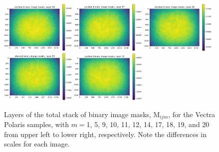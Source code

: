 \documentclass[letterpaper,11pt]{article}
\newcommand{\Mu}{\mathrm{M}}
\begin{document}
\begin{figure}[!ht]
\includegraphics[width=0.32\textwidth]{images/measuring_flatfield_corrections/mask_stack_layers_polaris/mask_stack_layer_14}
\includegraphics[width=0.32\textwidth]{images/measuring_flatfield_corrections/mask_stack_layers_polaris/mask_stack_layer_17}
\includegraphics[width=0.32\textwidth]{images/measuring_flatfield_corrections/mask_stack_layers_polaris/mask_stack_layer_18}
\includegraphics[width=0.32\textwidth]{images/measuring_flatfield_corrections/mask_stack_layers_polaris/mask_stack_layer_19}
\includegraphics[width=0.32\textwidth]{images/measuring_flatfield_corrections/mask_stack_layers_polaris/mask_stack_layer_20}
\caption{\footnotesize Layers of the total stack of binary image masks, $\Mu_{ijm}$, for the Vectra Polaris samples, with $m=$1, 5, 9, 10, 11, 12, 14, 17, 18, 19, and 20 from upper left to lower right, respectively. Note the differences in scales for each image.}
\label{fig:mask_stack_layers_polaris_1}
\end{figure}
\end{document}

